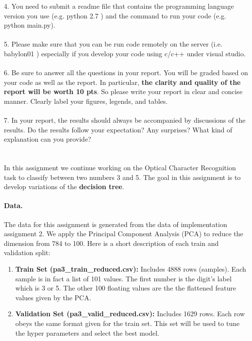 \documentclass{article}
\begin{document}
{4. You need to submit a readme file that contains the programming language version you use (e.g. python 2.7 ) and the command to run your code (e.g. python main.py).\\\\
{5. Please make sure that you can be run code remotely on  the server (i.e. babylon01 ) especially if you develop your code using c/c++ under visual studio. }\\\\
6. Be sure to answer all the questions in your report. You will be graded based on your code as well as the report. In particular, \textbf{the clarity and quality of the report will be worth 10 pts}. So please write your report in clear and concise manner. Clearly label your figures, legends, and tables.\\\\
7. In your report, the results should always be accompanied by discussions of the results. Do the results follow your expectation? Any surprises? What kind of explanation can you provide? \\
\newpage
{}\\\\
In this assignment we continue working on the Optical Character Recognition task to classify between two numbers 3 and 5. The goal in this assignment is to develop variations of the \textbf{decision tree}.
\paragraph{Data.} The data for this assignment is generated from the data of implementation assignment 2. We apply the Principal Component Analysis (PCA) to reduce the dimension from 784 to 100. Here is a short description of each train and validation split:\\
\begin{enumerate}
\item  \textbf{Train Set (pa3\_train\_reduced.csv):} Includes 4888 rows (samples). Each sample is in fact a list of 101 values. The first number is the digit's label which is 3 or 5. The other 100 floating values are the the flattened feature values given by the PCA.
\item \textbf{Validation Set (pa3\_valid\_reduced.csv):} Includes 1629 rows. Each row obeys the same format given for the train set. This set will be used to tune the hyper parameters and select the best model.
\end{enumerate}
}
\end{document}
